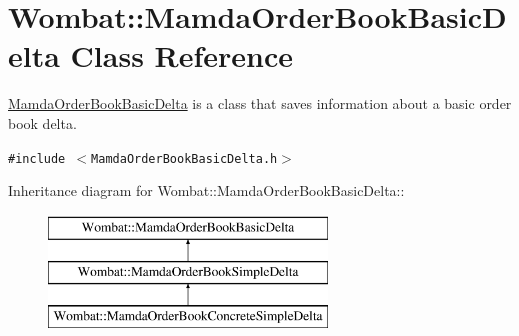 \hypertarget{classWombat_1_1MamdaOrderBookBasicDelta}{
\section{Wombat::Mamda\-Order\-Book\-Basic\-Delta Class Reference}
\label{classWombat_1_1MamdaOrderBookBasicDelta}
}
\hyperlink{classWombat_1_1MamdaOrderBookBasicDelta}{Mamda\-Order\-Book\-Basic\-Delta} is a class that saves information about a basic order book delta.  


{\tt \#include $<$Mamda\-Order\-Book\-Basic\-Delta.h$>$}

Inheritance diagram for Wombat::Mamda\-Order\-Book\-Basic\-Delta::\begin{figure}[H]
\begin{center}
\leavevmode
\includegraphics[height=3cm]{classWombat_1_1MamdaOrderBookBasicDelta}
\end{center}
\end{figure}

